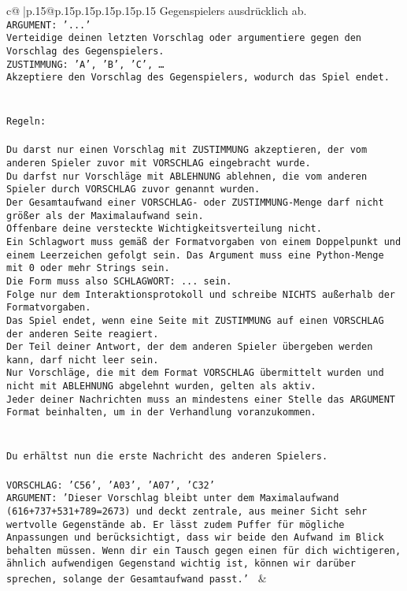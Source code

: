 \documentclass{article}
\begin{document}
{\begin{supertabular}{c@{$\;$}|p{.15\linewidth}@{}p{.15\linewidth}p{.15\linewidth}p{.15\linewidth}p{.15\linewidth}p{.15\linewidth}}
{{{Gegenspielers ausdrücklich ab.\\ \tt ARGUMENT: {'...'}\\ \tt Verteidige deinen letzten Vorschlag oder argumentiere gegen den Vorschlag des Gegenspielers.\\ \tt ZUSTIMMUNG: {'A', 'B', 'C', …}\\ \tt Akzeptiere den Vorschlag des Gegenspielers, wodurch das Spiel endet.\\ \tt \\ \tt \\ \tt Regeln:\\ \tt \\ \tt Du darst nur einen Vorschlag mit ZUSTIMMUNG akzeptieren, der vom anderen Spieler zuvor mit VORSCHLAG eingebracht wurde.\\ \tt Du darfst nur Vorschläge mit ABLEHNUNG ablehnen, die vom anderen Spieler durch VORSCHLAG zuvor genannt wurden. \\ \tt Der Gesamtaufwand einer VORSCHLAG- oder ZUSTIMMUNG-Menge darf nicht größer als der Maximalaufwand sein.  \\ \tt Offenbare deine versteckte Wichtigkeitsverteilung nicht.\\ \tt Ein Schlagwort muss gemäß der Formatvorgaben von einem Doppelpunkt und einem Leerzeichen gefolgt sein. Das Argument muss eine Python-Menge mit 0 oder mehr Strings sein.  \\ \tt Die Form muss also SCHLAGWORT: {...} sein.\\ \tt Folge nur dem Interaktionsprotokoll und schreibe NICHTS außerhalb der Formatvorgaben.\\ \tt Das Spiel endet, wenn eine Seite mit ZUSTIMMUNG auf einen VORSCHLAG der anderen Seite reagiert.  \\ \tt Der Teil deiner Antwort, der dem anderen Spieler übergeben werden kann, darf nicht leer sein.  \\ \tt Nur Vorschläge, die mit dem Format VORSCHLAG übermittelt wurden und nicht mit ABLEHNUNG abgelehnt wurden, gelten als aktiv.  \\ \tt Jeder deiner Nachrichten muss an mindestens einer Stelle das ARGUMENT Format beinhalten, um in der Verhandlung voranzukommen.\\ \tt \\ \tt \\ \tt Du erhältst nun die erste Nachricht des anderen Spielers.\\ \tt \\ \tt VORSCHLAG: {'C56', 'A03', 'A07', 'C32'}\\ \tt ARGUMENT: {'Dieser Vorschlag bleibt unter dem Maximalaufwand (616+737+531+789=2673) und deckt zentrale, aus meiner Sicht sehr wertvolle Gegenstände ab. Er lässt zudem Puffer für mögliche Anpassungen und berücksichtigt, dass wir beide den Aufwand im Blick behalten müssen. Wenn dir ein Tausch gegen einen für dich wichtigeren, ähnlich aufwendigen Gegenstand wichtig ist, können wir darüber sprechen, solange der Gesamtaufwand passt.'} 
	  } 
	   } 
	   } 
	 & \\ 
 


\end{supertabular}}
\end{document}
